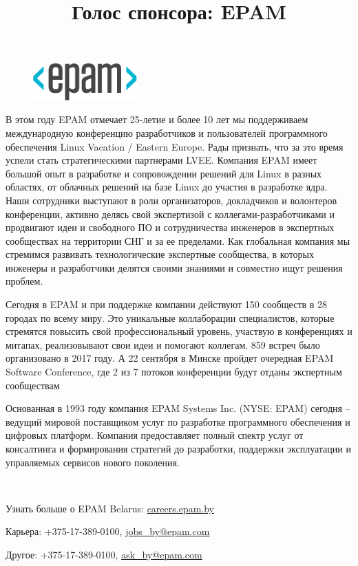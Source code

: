\documentclass[10pt, a5paper]{article}
\begin{document}
\title{Голос спонсора: EPAM}
\date{}
\maketitle%
 
\begin{center}
\begin{figure}[h!]
  \centering
  \includegraphics[width=4cm]{epam_logo}
\end{figure}
\end{center} 

\small

В этом году EPAM отмечает 25-летие и более 10 лет мы поддерживаем международную конференцию разработчиков и пользователей программного обеспечения Linux Vacation / Eastern Europe. Рады признать, что за это время успели стать стратегическими партнерами LVEE. Компания EPAM имеет большой опыт в разработке и сопровождении решений для Linux в разных областях, от облачных решений на базе Linux до участия в разработке ядра. Наши сотрудники выступают в роли организаторов, докладчиков и волонтеров конференции, активно делясь свой экспертизой с коллегами-разработчиками и продвигают идеи и свободного ПО и сотрудничества инженеров в экспертных сообществах на территории СНГ и за ее пределами.  Как глобальная компания мы стремимся развивать технологические экспертные сообщества, в которых инженеры и разработчики делятся своими знаниями и совместно ищут решения проблем.  

Сегодня в EPAM и при поддержке компании действуют 150 сообществ в 28 городах по всему миру.  Это уникальные коллаборации специалистов, которые стремятся повысить свой профессиональный уровень, участвую в конференциях и митапах, реализовывают свои идеи и помогают коллегам. 859 встреч было организовано в 2017 году. А 22 сентября в Минске пройдет очередная EPAM Software Conference, где 2 из 7 потоков конференции будут отданы экспертным сообществам 

Основанная в 1993 году компания EPAM Systems Inc. (NYSE: EPAM) сегодня – ведущий мировой поставщиком услуг по разработке программного обеспечения и цифровых платформ. Компания предоставляет полный спектр услуг от консалтинга и формирования стратегий до разработки, поддержки эксплуатации и управляемых сервисов нового поколения.  

~

Узнать больше о EPAM Belarus: \url{careers.epam.by}

Карьера: +375-17-389-0100, \url{jobs_by@epam.com}

Другое: +375-17-389-0100, \url{ask_by@epam.com }


\end{document}
